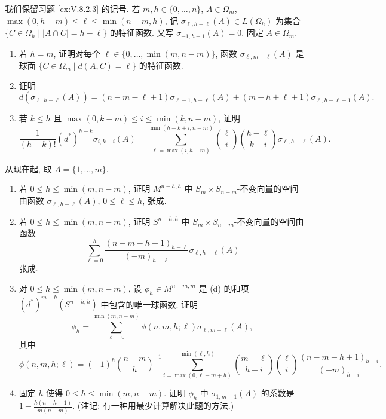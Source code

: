\begin{solution}
\end{solution}

\begin{exercise}
\label{ex:V.8.2.4}
我们保留习题 \ref{ex:V.8.2.3} 的记号. 若 $m, h \in \{0, \ldots, n\}$, $A \in \Omega_m$, $\max(0, h-m) \leq \ell \leq \min(n-m, h)$, 记 $\sigma_{\ell,h-\ell}(A) \in L(\Omega_h)$ 为集合 $\{C \in \Omega_h \mid |A \cap C| = h - \ell\}$ 的特征函数. 又写 $\sigma_{-1,h+1}(A) = 0$. 固定 $A \in \Omega_m$.
\begin{enumerate}
\item[(a)] 若 $h = m$, 证明对每个 $\ell \in \{0, \ldots, \min(m, n-m)\}$, 函数 $\sigma_{\ell,m-\ell}(A)$ 是球面 $\{C \in \Omega_m \mid d(A, C) = \ell\}$ 的特征函数.
\item[(b)] 证明
\[
d(\sigma_{\ell,h-\ell}(A)) = (n - m - \ell + 1)\sigma_{\ell-1,h-\ell}(A) + (m - h + \ell + 1)\sigma_{\ell,h-\ell-1}(A).
\]
\item[(c)] 若 $k \leq h$ 且 $\max(0, k-m) \leq i \leq \min(k, n-m)$, 证明
\[
\frac{1}{(h-k)!}(d^*)^{h-k}\sigma_{i,k-i}(A) = \sum_{\ell = \max(i,h-m)}^{\min(h-k+i,n-m)}\binom{\ell}{i}\binom{h-\ell}{k-i}\sigma_{\ell,h-\ell}(A).
\]
\end{enumerate}
从现在起, 取 $A = \{1, \ldots, m\}$.
\begin{enumerate}
\item[(a)] 若 $0 \leq h \leq \min(m, n-m)$, 证明 $M^{n-h,h}$ 中 $S_m \times S_{n-m}$-不变向量的空间由函数 $\sigma_{\ell,h-\ell}(A)$, $0 \leq \ell \leq h$, 张成.
\item[(b)] 若 $0 \leq h \leq \min(m, n-m)$, 证明 $S^{n-h,h}$ 中 $S_m \times S_{n-m}$-不变向量的空间由函数
\[
\sum_{\ell=0}^h\frac{(n - m - h + 1)_{h-\ell}}{(-m)_{h-\ell}}\sigma_{\ell,h-\ell}(A)
\]
张成.
\item[(c)] 对 $0 \leq h \leq \min(m, n-m)$, 设 $\phi_h \in M^{n-m,m}$ 是 (d) 的和项 $(d^*)^{m-h}(S^{n-h,h})$ 中包含的唯一球函数. 证明
\[
\phi_h = \sum_{\ell=0}^{\min(m,n-m)}\phi(n, m, h; \ell)\sigma_{\ell,m-\ell}(A),
\]
其中
\[
\phi(n, m, h; \ell) = (-1)^h\binom{n-m}{h}^{-1}\sum_{i=\max(0,\ell-m+h)}^{\min(\ell,h)}\binom{m-\ell}{h-i}\binom{\ell}{i}\frac{(n-m-h+1)_{h-i}}{(-m)_{h-i}}.
\]
\item[(d)] 固定 $h$ 使得 $0 \leq h \leq \min(m, n-m)$. 证明 $\phi_h$ 中 $\sigma_{1,m-1}(A)$ 的系数是 $1 - \frac{h(n-h+1)}{m(n-m)}$. (注记: 有一种用最少计算解决此题的方法.)
\end{enumerate}
\end{exercise}

